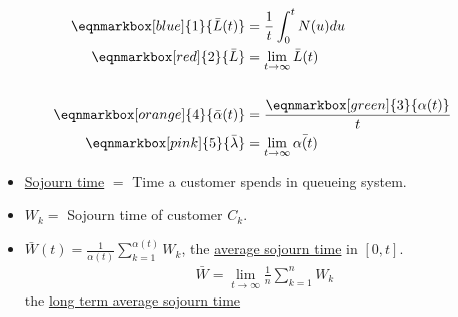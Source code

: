 \begin{definition}
    \begin{align}
        \eqnmarkbox[blue]{1}{\bar{L}(t)} &= \frac{1}{t}\int_0^t N(u)du \nonumber \\
        \eqnmarkbox[red]{2}{\bar{L}} &= \lim\limits_{t\to\infty} \bar{L}(t) \nonumber \\
        & {} \nonumber \\
        \eqnmarkbox[orange]{4}{\bar{\alpha}(t)} &= \frac{\eqnmarkbox[green]{3}{\alpha(t)}}{t} \nonumber \\
        \eqnmarkbox[pink]{5}{\bar{\lambda}} &= \lim\limits_{t\to\infty} \bar{\alpha(t)}  \label{4.2}
    \end{align}

    \begin{itemize}
        \item \uline{Sojourn time} $=$ Time a customer spends in queueing system.
        \item $W_k = $ Sojourn time of customer $C_k$.
        \item $\bar{W}(t) = \frac{1}{\alpha(t)}\sum\limits_{k=1}^{\alpha(t)} W_k$, the \uline{average sojourn time} in $[0,t]$.
        \begin{align}
            \bar{W} = \lim\limits_{t\to\infty} \frac{1}{n} \sum\limits_{k=1}^n W_k \label{4.3}
        \end{align}
        the \uline{long term average sojourn time}
    \end{itemize}
\end{definition}

